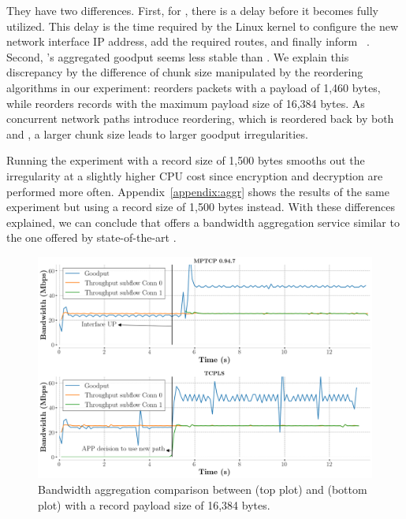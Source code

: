 They have two differences. First, for \mptcp, there is a delay before it becomes fully utilized. This delay is the time required by the Linux kernel
to configure the new network interface IP address, add the required routes, and
finally inform \mptcp~\cite{paasch2012exploring}.
Second, \tcpls's aggregated goodput seems less stable than \mptcp. We explain
this discrepancy by the difference of chunk size manipulated by the reordering
algorithms in our experiment: \mptcp reorders packets with a payload of 1,460
bytes, while \tcpls reorders records with the maximum payload size of 16,384 bytes. As concurrent network paths introduce reordering, which is reordered back by both \mptcp and \tcpls, a larger chunk size leads to larger goodput irregularities.

Running the experiment with a record size of 1,500 bytes smooths out the irregularity at a slightly higher CPU cost since encryption and decryption are performed more often. Appendix~\ref{appendix:aggr} shows the results of the same experiment but using a \tls record size of 1,500 bytes instead. With these differences explained, we can conclude that \tcpls offers a bandwidth aggregation service similar to the one offered by state-of-the-art \mptcp.


\begin{figure}[!t]
	\begin{center}
		\includegraphics[width=\columnwidth]{figures/aggregate_dual.png}
	\end{center}
	\caption{Bandwidth aggregation comparison between \mptcp (top plot) and
		\tcpls (bottom plot) with a record payload size of 16,384 bytes.}
	\label{fig:multipath_aggregation}
\end{figure}

